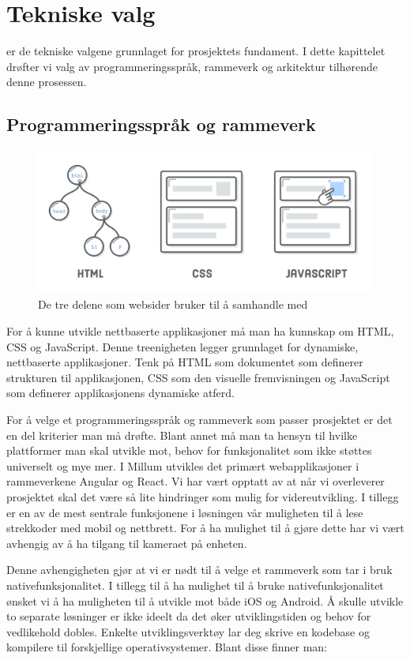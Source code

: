 
\chapter{Tekniske valg}
 er de tekniske valgene grunnlaget for prosjektets fundament. I dette kapittelet drøfter vi valg av programmeringsspråk, rammeverk og arkitektur tilhørende denne prosessen.

\section{\textbf{Programmeringsspråk og rammeverk}}
\begin{figure} 
\includegraphics[width=\textwidth]{figures/HTML-CSS-JS.png}
\caption{De tre delene som websider bruker til å samhandle med}
\end{figure}
For å kunne utvikle nettbaserte applikasjoner må man ha kunnskap om HTML, CSS og JavaScript. Denne treenigheten legger grunnlaget for dynamiske, nettbaserte applikasjoner. Tenk på HTML som dokumentet som definerer strukturen til applikasjonen, CSS som den visuelle fremvisningen og JavaScript som definerer applikasjonens dynamiske atferd. 

For å velge et programmeringsspråk og rammeverk som passer prosjektet er det en del kriterier man må drøfte. Blant annet må man ta hensyn til hvilke plattformer man skal utvikle mot, behov for funksjonalitet som ikke støttes universelt og mye mer. I Millum utvikles det primært webapplikasjoner i rammeverkene Angular og React. Vi har vært opptatt av at når vi overleverer prosjektet skal det være så lite hindringer som mulig for videreutvikling. I tillegg er en av de mest sentrale funksjonene i løsningen vår muligheten til å lese strekkoder med mobil og nettbrett. For å ha mulighet til å gjøre dette har vi vært avhengig av å ha tilgang til kameraet på enheten. 

Denne avhengigheten gjør at vi er nødt til å velge et rammeverk som tar i bruk nativefunksjonalitet. I tillegg til å ha mulighet til å bruke nativefunksjonalitet ønsket vi å ha muligheten til å utvikle mot både iOS og Android. Å skulle utvikle to separate løsninger er ikke ideelt da det øker utviklingstiden og behov for vedlikehold dobles. Enkelte utviklingsverktøy lar deg skrive en kodebase og kompilere til forskjellige operativsystemer. Blant disse finner man:

